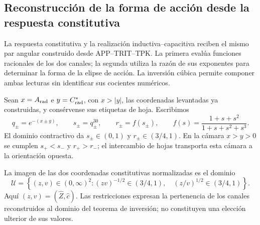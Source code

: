 \subsection{Reconstrucción de la forma de acción desde la respuesta constitutiva}
\label{iii:iii:subsec:puente-forma-LC}

La respuesta constitutiva y la realización inductiva--capacitiva reciben
el mismo par angular construido desde APP--TRIT--TPK. La primera evalúa
funciones racionales de los dos canales; la segunda utiliza la razón de
sus exponentes para determinar la forma de la elipse de acción. La
inversión cúbica permite componer ambas lecturas sin identificar sus
cocientes numéricos.

Sean $x=A_{\rm rad}$ e $y=C^*_{\rm rad}$, con $x>|y|$, las coordenadas
levantadas ya construidas, y consérvense sus etiquetas de hoja. Escribimos
\begin{equation}
 q_\pm=e^{-(x\pm y)},\qquad s_\pm=q_\pm^{30},\qquad
 r_\pm=f(s_\pm),\qquad
 f(s)=\frac{1+s+s^2}{1+s+s^2+s^3}.
 \label{iii:iii:eq:forma-canales}
\end{equation}
El dominio contractivo da $s_\pm\in(0,1)$ y
$r_\pm\in(3/4,1)$. En la cámara $x>y>0$ se cumplen
$s_+<s_-$ y $r_+>r_-$; el intercambio de hojas transporta esta cámara
a la orientación opuesta.

La imagen de las dos coordenadas constitutivas normalizadas es el dominio
\begin{equation}
 \mathcal U=\left\{(z,v)\in(0,\infty)^2:
   (zv)^{-1/2}\in(3/4,1),\quad
   (z/v)^{1/2}\in(3/4,1)\right\}.
 \label{iii:iii:eq:forma-dominio}
\end{equation}
Aquí $(z,v)=(\widehat Z,\widehat c)$. Las restricciones expresan la
pertenencia de los canales reconstruidos al dominio del teorema de
inversión; no constituyen una elección ulterior de sus valores.

